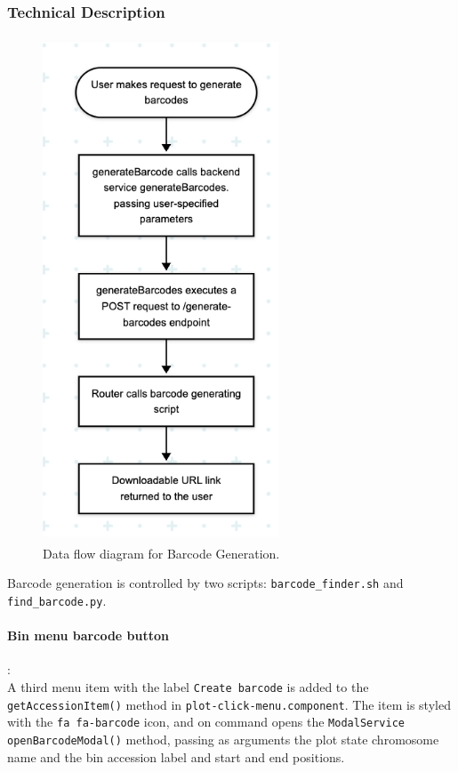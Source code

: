 \documentclass[12pt]{article}
\begin{document}
\subsubsection{Technical Description}

\begin{figure}[h]
    \centering
    \includegraphics[width=7cm, height=15cm]{Bar2.png}
    \caption{Data flow diagram for Barcode Generation.}
\end{figure}

Barcode generation is controlled by two scripts: \verb+barcode_finder.sh+ and \verb+find_barcode.py+. 

\paragraph{Bin menu barcode button}:\\
A third menu item with the label \verb+Create barcode+ is added to the \verb+getAccessionItem()+ method in \verb+plot-click-menu.component+. The item is styled with the \verb+fa fa-barcode+ icon, and on command opens the \verb+ModalService openBarcodeModal()+ method, passing as arguments the plot state chromosome name and the bin accession label and start and end positions.
\end{document}
